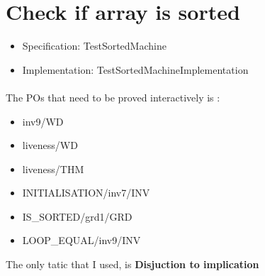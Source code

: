\section{Check if array is sorted}

\begin{itemize}
\item Specification: TestSortedMachine
\item Implementation: TestSortedMachineImplementation
\end{itemize}

\paragraph{}
The POs that need to be proved interactively is :
\begin{itemize}
\item inv9/WD
\item liveness/WD
\item liveness/THM
\item INITIALISATION/inv7/INV
\item IS\_SORTED/grd1/GRD
\item LOOP\_EQUAL/inv9/INV
\end{itemize}

The only tatic that I used, is \textbf{Disjuction to implication}